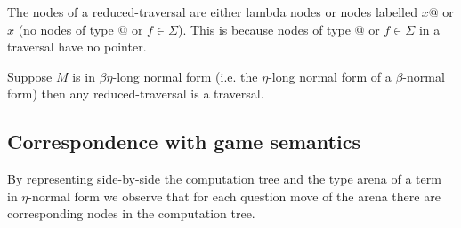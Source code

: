 The nodes of a reduced-traversal are either lambda nodes or nodes labelled $x@$ or $x$ (no nodes of type $@$ or $f \in \Sigma$).
This is because nodes of type $@$ or $f \in \Sigma$ in a traversal have no pointer.

\begin{property}
\label{proper:redtrav_trav}
Suppose $M$ is in $\beta \eta$-long normal form (i.e. the $\eta$-long normal form of a $\beta$-normal form) then
any reduced-traversal is a traversal.
\end{property}

\subsection{Correspondence with game semantics}

By representing side-by-side the computation tree and the type arena of a term in $\eta$-normal form we observe
that for each question move of the arena there are corresponding nodes in the computation tree.

